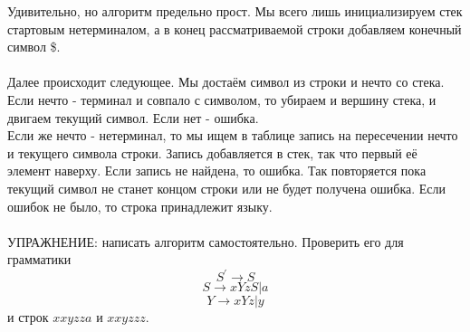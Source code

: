 \documentclass[14pt]{extarticle}
\begin{document}
Удивительно, но алгоритм предельно прост. Мы всего лишь инициализируем 
стек стартовым нетерминалом, а в конец рассматриваемой строки добавляем
конечный символ \$.\\\\
Далее происходит следующее. Мы достаём символ из строки и нечто со стека.
Если нечто - терминал и совпало с символом, то убираем и вершину стека, 
и двигаем текущий символ. Если нет - ошибка.\\
Если же нечто - нетерминал, то мы ищем в таблице запись на пересечении
нечто и текущего символа строки. Запись добавляется в стек, так что 
первый её элемент наверху. Если запись не найдена, то ошибка.
Так повторяется пока текущий символ не станет концом строки или не 
будет получена ошибка. Если ошибок не было, то строка принадлежит языку.
\\\\
УПРАЖНЕНИЕ: написать алгоритм самостоятельно. Проверить его для 
грамматики 
$$S^{'} \to S$$
$$S \to xYzS | a$$
$$Y \to xYz | y$$
и строк $xxyzza$ и $xxyzzz$.
\end{document}
